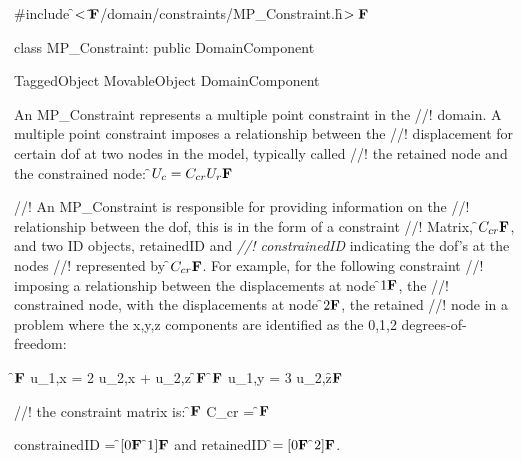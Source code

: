 
\indent \#include \f$<\tilde{ }{\bf F}$/domain/constraints/MP\_Constraint.h\f$>{\bf F}$

\indent class MP\_Constraint: public DomainComponent

\indent TaggedObject
\indent MovableObject
\indent\indent DomainComponent
\indent\indent{}

\indent An MP\_Constraint represents a multiple point constraint in the
//! domain. A multiple point constraint imposes a relationship between the
//! displacement for certain dof at two nodes in the model, typically called
//! the \p retained node and the \p constrained node: \f$U_c = C_{cr} U_r{\bf F}$


//! An MP\_Constraint is responsible for providing information on the
//! relationship between the dof, this is in the form of a constraint
//! Matrix, \f$C_{cr}{\bf F}$, and two ID objects, \p retainedID and {\em
//! constrainedID} indicating the dof's at the nodes 
//! represented by \f$C_{cr}{\bf F}$. For example, for the following constraint
//! imposing a relationship between the displacements at node \f$1{\bf F}$, the 
//! constrained node, with the displacements at node \f$2{\bf F}$, the retained
//! node in a problem where the x,y,z components are identified as the
0,1,2 degrees-of-freedom:

\f${\bf F}$ u_{1,x} = 2 u_{2,x} + u_{2,z} \f${\bf F}$
\f${\bf F}$ u_{1,y} = 3 u_{2,z}\f${\bf F}$

//! the constraint matrix is:
\f${\bf F}$ C_{cr} =
\left[
\begin{array}{cc}
2 & 1
0 & 3
\end{array}
\right] 
\f${\bf F}$

\p constrainedID = \f$[0{\bf F}$ \f$1]{\bf F}$ and \p retainedID \f$= [0{\bf F}$ \f$2]{\bf F}$.

